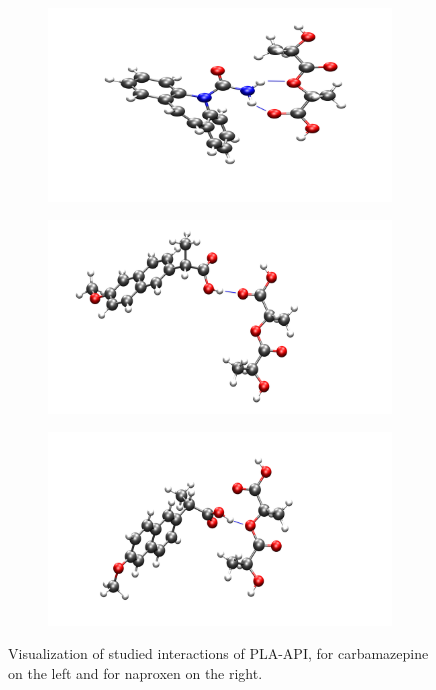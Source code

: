 \begin{figure}[htb!]
	\begin{subfigure}{0.33\textwidth}
		\includegraphics[width=\linewidth]{img/cbz_interakce.png} 
	\end{subfigure}
	\begin{subfigure}{0.31\textwidth}
		\includegraphics[width=\linewidth]{img/nap1_interakce.png} 
	\end{subfigure}   	
	\begin{subfigure}{0.33\textwidth}
		\includegraphics[width=\linewidth]{img/nap2_interakce.png} 
	\end{subfigure}
	\caption{Visualization of studied interactions of PLA-API, for carbamazepine on the left and for naproxen on the right.}
	\label{fig:contact}    
\end{figure}


